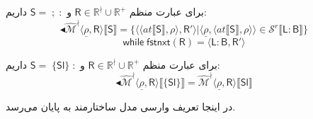 برای عبارت منظم 
$\mathsf{R} \in \mathbb{R}^\nmid \cup \mathbb{R^+}$
و 
$\mathsf{S= \; ; \;:}$
داریم:
$$\blacktriangleleft\mathcal{\hat{M}^\nmid}  \langle \underline{\rho}, \mathsf{R} \rangle \llbracket \mathsf{S} \rrbracket = \{\langle \langle at \llbracket \mathsf{S} \rrbracket , \rho \rangle , \mathsf{R'} \rangle | \langle \underline{\rho}, \langle at \llbracket \mathsf{S} \rrbracket , \rho \rangle \rangle \in \mathcal{S}^r \llbracket \mathsf{L:B}\rrbracket\}$$
$$\mathsf{while \; fstnxt (R) = \langle L:B,R' \rangle}$$
	
	

برای عبارت منظم 
$\mathsf{R} \in \mathbb{R}^\nmid \cup \mathbb{R^+}$
و 
$\mathsf{S= \; \{Sl\} \;:}$
داریم:
$$\blacktriangleleft \mathcal{\hat{M}^\nmid} \langle \underline{\rho}, \mathsf{R} \rangle \llbracket \{\mathsf{Sl}\} \rrbracket =
 \mathcal{\hat{M}^\nmid} \langle \underline{\rho}, \mathsf{R} \rangle \llbracket \mathsf{Sl} \rrbracket$$

در اینجا تعریف وارسی مدل ساختارمند به پایان می‌رسد.

 